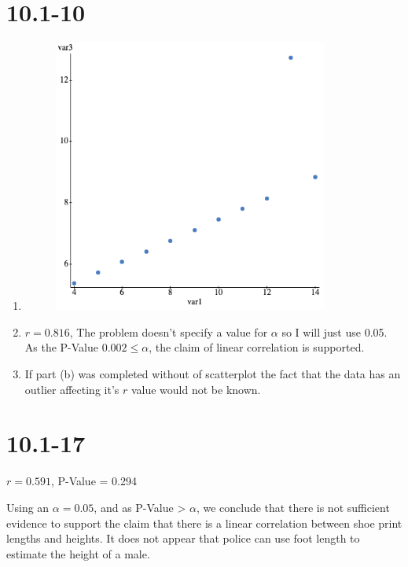 \documentclass[12pt,fleqn]{article}
\newcommand{\problemtenone}[1]{\vspace{5ex}\section*{10.1-#1}}
\begin{document}
\problemtenone{10}
\pagebreak
\begin{enumerate}[label=\alph*.]
\item
  \begin{figure}[ht]
    \centering
    \includegraphics[width=9cm]{assets/scatterplot-2.png}
  \end{figure}

\item $r = 0.816$, The problem doesn't specify a value for $\alpha$ so I will just use 0.05. As the P-Value $0.002 \le \alpha$, the claim of linear correlation is supported.

\item If part (b) was completed without of scatterplot the fact that the data has an outlier affecting it's $r$ value would not be known.
\end{enumerate}


\problemtenone{17}
$r = 0.591$, P-Value = 0.294

Using an $\alpha = 0.05$, and as P-Value > $\alpha$, we conclude that there is not sufficient evidence to support the claim that there is a linear correlation between shoe print lengths and heights. It does not appear that police can use foot length to estimate the height of a male.
\end{document}
